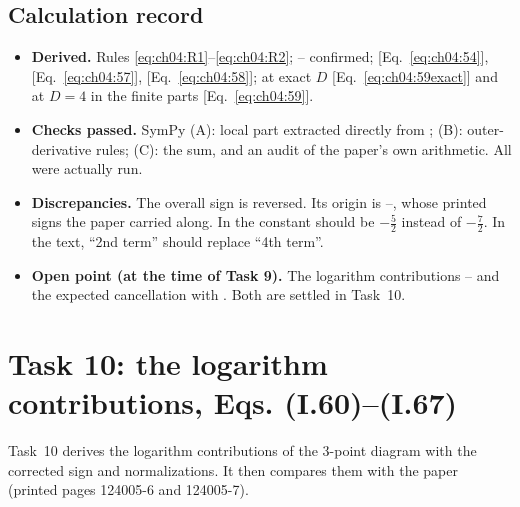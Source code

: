\subsection{Calculation record}
\begin{itemize}[leftmargin=1.2em,itemsep=2pt]
\item \textbf{Derived.} Rules \eqref{eq:ch04:R1}--\eqref{eq:ch04:R2}; -- confirmed;
 [Eq.~\eqref{eq:ch04:54}],  [Eq.~\eqref{eq:ch04:57}],  [Eq.~\eqref{eq:ch04:58}];
 at exact $D$ [Eq.~\eqref{eq:ch04:59exact}] and at $D=4$ in the finite parts [Eq.~\eqref{eq:ch04:59}].
\item \textbf{Checks passed.} SymPy (A): local part extracted directly from ; (B): outer-derivative rules; (C): the sum, and an audit of the paper's own arithmetic.
All were actually run.
\item \textbf{Discrepancies.} The overall sign is reversed. Its origin is --, whose printed signs the paper carried along.
In  the constant should be $-\frac52$ instead of $-\frac72$.
In the text, ``2nd term'' should replace ``4th term''.
\item \textbf{Open point (at the time of Task 9).} The logarithm contributions -- and the expected cancellation with .
Both are settled in Task~10.
\end{itemize}

\section{Task 10: the logarithm contributions, Eqs. (I.60)--(I.67)}
\label{sec:ch04:task10}

Task~10 derives the logarithm contributions of the 3-point diagram with the corrected sign and normalizations.
It then compares them with the paper (printed pages 124005-6 and 124005-7).

